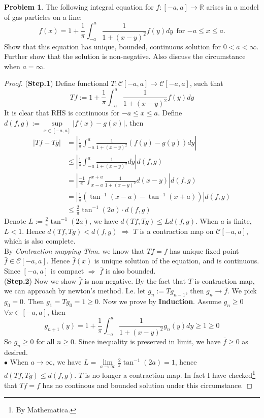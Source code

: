 \documentclass[a4paper, 10pt]{article}
\theoremstyle{definition}
\newtheorem{problem}{Problem}
\theoremstyle{hSol}
\begin{document}
\begin{problem} The following integral equation for $f:[-a, a]\to \mathbb{R}$ arises in a model of gas particles on a line:
$$f(x)=1+\frac{1}{\pi}\int_{-a}^a \frac{1}{1+(x-y)^2}f(y)dy~~\text{for $-a\leq x \leq a$.}$$
Show that this equation has unique, bounded, continuous solution for $0<a<\infty$. Further show that the solution is non-negative. Also discuss the circumstance when $a=\infty$.
\end{problem}
\begin{proof} (\textbf{Step.1}) Define functional $T: \mathcal{C}[-a,a]\to \mathcal{C}[-a,a]$, such that
\begin{equation}
  Tf:=1+\frac{1}{\pi}\int_{-a}^a \frac{1}{1+(x-y)^2}f(y)dy
\end{equation}
It is clear that RHS is continuous for $-a\leq x\leq a$. Define $d(f,g):=\sup\limits_{x\in[-a,a]}|f(x)-g(x)|$, then
\begin{equation}
  \begin{split}
    |Tf-Tg| &= \left|\frac{1}{\pi}\int_{-a}^a \frac{1}{1+(x-y)^2}(f(y)-g(y))dy\right| \\
    & \leq \left|\frac{1}{\pi}\int_{-a}^a \frac{1}{1+(x-y)^2}dy\right|d(f,g) \\
    & = \left|\frac{-1}{\pi}\int_{x-a}^{x+a} \frac{1}{1+(x-y)^2}d(x-y)\right|d(f,g)\\
    & = \left|\frac{1}{\pi}\left(\tan^{-1}(x-a)-\tan^{-1}(x+a)\right)\right|d(f,g)\\
    & \leq \frac{2}{\pi}\tan^{-1}(2a)\cdot d(f,g)
  \end{split}
\end{equation}
Denote $L:=\frac{2}{\pi}\tan^{-1}(2a)$, we have $d(Tf,Tg)\leq Ld(f,g)$. When $a$ is finite, $L<1$. Hence $d(Tf,Tg)<d(f,g)$ $\Rightarrow$ $T$ is a contraction map on $\mathcal{C}[-a,a]$, which is also complete. \\
By \textit{Contraction mapping Thm.} we know that $Tf=f$ has unique fixed point $\bar{f}\in \mathcal{C}[-a,a]$. Hence $\bar{f}(x)$ is unique solution of the equation, and is continuous. Since $[-a,a]$ is compact $\Rightarrow$ $\bar{f}$ is also bounded.\\
(\textbf{Step.2}) Now we show $\bar{f}$ is non-negative. By the fact that $T$ is contraction map, we can approach by newton's method. I.e. let $g_n := Tg_{n-1}$, then $g_n \to \bar{f}$. We pick $g_0 = 0$. Then $g_1 = Tg_0 = 1\geq 0$. Now we prove by \textbf{Induction}. Assume $g_n \geq 0$ $\forall x\in [-a,a]$, then
\begin{equation}
  g_{n+1}(y) = 1+\frac{1}{\pi}\int_{-a}^a \frac{1}{1+(x-y)^2}g_n(y)dy \geq 1 \geq 0
\end{equation}
So $g_n \geq 0$ for all $n\geq 0$. Since inequality is preserved in limit, we have $\bar{f}\geq 0$ as desired. \\
$\bullet$ When $a\to \infty$, we have $L=\lim\limits_{a\rightarrow\infty}\frac{2}{\pi}\tan^{-1}(2a)=1$, hence $d(Tf, Tg)\leq d(f,g)$. $T$ is no longer a contraction map. In fact I have checked\footnote{By Mathematica.} that $Tf=f$ has no continous and bounded solution under this circumstance.
\end{proof}
\end{document}
